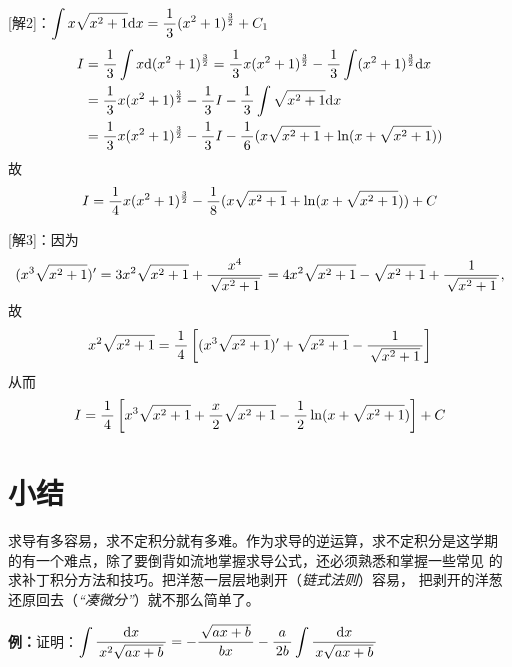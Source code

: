 [解2]：$\dint x\sqrt{x^2+1}\d x=\df13(x^2+1)^{\frac32}+C_1$
\begin{align}
I&=\df13\dint x\d(x^2+1)^{\frac32}=\df13 x(x^2+1)^{\frac32}
-\df13\dint(x^2+1)^{\frac32}\d x\notag\\
&=\df13x(x^2+1)^{\frac32}-\df13I-\df13\dint\sqrt{x^2+1}\d x\notag\\
&=\df13x(x^2+1)^{\frac32}-\df13I-\df16(x\sqrt{x^2+1}
+\ln(x+\sqrt{x^2+1}))\notag
\end{align}
故
$$I=\df14x(x^2+1)^{\frac32}-\df18(x\sqrt{x^2+1}
+\ln(x+\sqrt{x^2+1}))+C$$

[解3]：因为
$$(x^3\sqrt{x^2+1})'=3x^2\sqrt{x^2+1}+\df{x^4}{\sqrt{x^2+1}}
=4x^2\sqrt{x^2+1}-\sqrt{x^2+1}+\df1{\sqrt{x^2+1}},$$
故
$$x^2\sqrt{x^2+1}=\df14\left[(x^3\sqrt{x^2+1})'+\sqrt{x^2+1}
-\df1{\sqrt{x^2+1}}\right]$$
从而
$$I=\df14\left[x^3\sqrt{x^2+1}+\df x2\sqrt{x^2+1}
-\df12\ln(x+\sqrt{x^2+1})\right]+C$$

% 	

\section{小结}

求导有多容易，求不定积分就有多难。作为求导的逆运算，求不定积分是这学期
的有一个难点，除了要倒背如流地掌握求导公式，还必须熟悉和掌握一些常见
的求补丁积分方法和技巧。把洋葱一层层地剥开（{\it 链式法则}）容易，
把剥开的洋葱还原回去（{\it “凑微分”}）就不那么简单了。

\newpage

{\bf 例：}证明：$\dint\df{\d x}{x^2\sqrt{ax+b}}=-\df{\sqrt{ax+b}}{bx}
-\df{a}{2b}\dint\df{\d x}{x\sqrt{ax+b}}$

